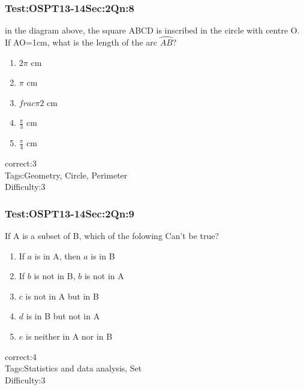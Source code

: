 \documentclass[]{beamer}
\begin{document}
    \begin{frame}
	    \frametitle{Test:OSPT13-14\hspace{2mm}Sec:2\hspace{2mm}Qn:8}
	    in the diagram above, the square ABCD is inscribed in the circle with centre O. If AO=1cm, what is the length of the arc $\wideparen{AB}$?
	   \begin{enumerate}
	        \item
	           $2\pi$ cm
	        \item
	           $\pi$ cm
	        \item
	           $frac{\pi}{2}$ cm
	        \item
	           $\frac{\pi}{3}$ cm 
	        \item
			   $\frac{\pi}{4}$ cm	           
	    \end{enumerate}
	    correct:3\\   
	    Tags:Geometry, Circle, Perimeter \\
	    Difficulty:3   \\
    \end{frame}    
    \begin{frame}
	    \frametitle{Test:OSPT13-14\hspace{2mm}Sec:2\hspace{2mm}Qn:9}
	    If A is a subset of B, which of the folowing Can't be true?
	   \begin{enumerate}
	        \item
	           If $a$ is in A, then $a$ is in B 
	        \item
	           If $b$ is not in B, $b$ is not in A
	        \item
	           $c$ is not in A but in B
	        \item
	            $d$ is in B but not in A
	        \item
	           $e$ is neither in A nor in B
	    \end{enumerate}
	    correct:4\\   
	    Tags:Statistics and data analysis, Set \\
	    Difficulty:3   \\
    \end{frame}    
\end{document}
